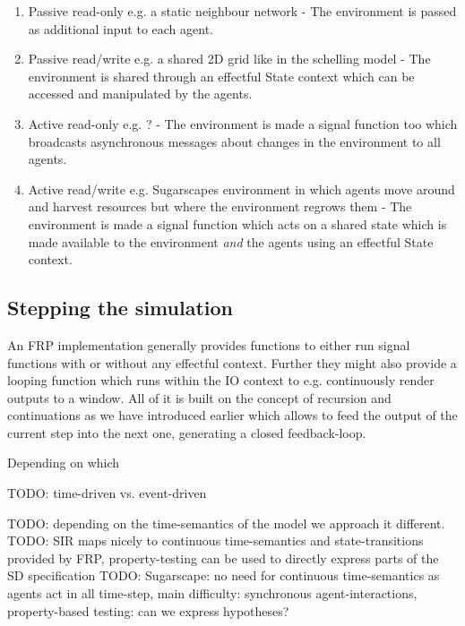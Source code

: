 \begin{enumerate}
	\item Passive read-only e.g. a static neighbour network - The environment is passed as additional input to each agent.
	\item Passive read/write e.g. a shared 2D grid like in the schelling model \cite{schelling_dynamic_1971} - The environment is shared through an effectful State context which can be accessed and manipulated by the agents.
	\item Active read-only e.g. ? - The environment is made a signal function too which broadcasts asynchronous messages about changes in the environment to all agents.
	\item Active read/write e.g. Sugarscapes environment in which agents move around and harvest resources but where the environment regrows them - The environment is made a signal function which acts on a shared state which is made available to the environment \textit{and} the agents using an effectful State context.
\end{enumerate}

\subsection{Stepping the simulation}
An FRP implementation generally provides functions to either run signal functions with or without any effectful context. Further they might also provide a looping function which runs within the IO context to e.g. continuously render outputs to a window. All of it is built on the concept of recursion and continuations as we have introduced earlier which allows to feed the output of the current step into the next one, generating a closed feedback-loop.

Depending on which 

TODO: time-driven vs. event-driven 

TODO: depending on the time-semantics of the model we approach it different. 
TODO: SIR maps nicely to continuous time-semantics and state-transitions provided by FRP, property-testing can be used to directly express parts of the SD specification
TODO: Sugarscape: no need for continuous time-semantics as agents act in all time-step, main difficulty: synchronous agent-interactions, property-based testing: can we express hypotheses?